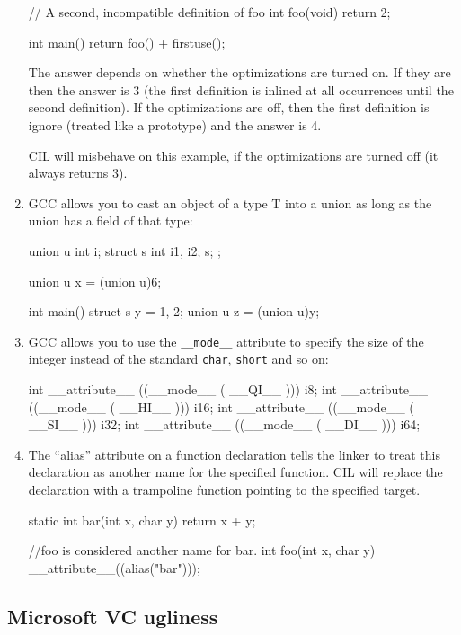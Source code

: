 \documentclass[letterpaper]{article}
\def\t#1{{\tt #1}}
\begin{document}
\begin{enumerate}
\begin{cilcode}[global]
// A second, incompatible definition of foo
int foo(void) { return 2; }

int main() {
    return foo() + firstuse();
}
\end{cilcode}

 The answer depends on whether the optimizations are turned on. If they are
then the answer is 3 (the first definition is inlined at all occurrences until
the second definition). If the optimizations are off, then the first
definition is ignore (treated like a prototype) and the answer is 4. 

 CIL will misbehave on this example, if the optimizations are turned off (it
 always returns 3).

\item GCC allows you to cast an object of a type T into a union as long as the
union has a field of that type:
\begin{cilcode}[global]
union u { 
   int i; 
   struct s { 
      int i1, i2;
   } s;
};

union u x = (union u)6;

int main() {
  struct s y = {1, 2};
  union u  z = (union u)y;
}
\end{cilcode}

\item GCC allows you to use the \t{\_\_mode\_\_} attribute to specify the size
of the integer instead of the standard \t{char}, \t{short} and so on:
\begin{cilcode}[global]
int __attribute__ ((__mode__ (  __QI__ ))) i8;
int __attribute__ ((__mode__ (  __HI__ ))) i16;
int __attribute__ ((__mode__ (  __SI__ ))) i32;
int __attribute__ ((__mode__ (  __DI__ ))) i64;
\end{cilcode}

\item The ``alias'' attribute on a function declaration tells the
  linker to treat this declaration as another name for the specified
  function.  CIL will replace the declaration with a trampoline
  function pointing to the specified target.
\begin{cilcode}[global]
    static int bar(int x, char y) {
      return x + y;
    }

    //foo is considered another name for bar.
    int foo(int x, char y) __attribute__((alias("bar")));
\end{cilcode}

\end{enumerate}

 \subsection{Microsoft VC ugliness}
\end{document}
